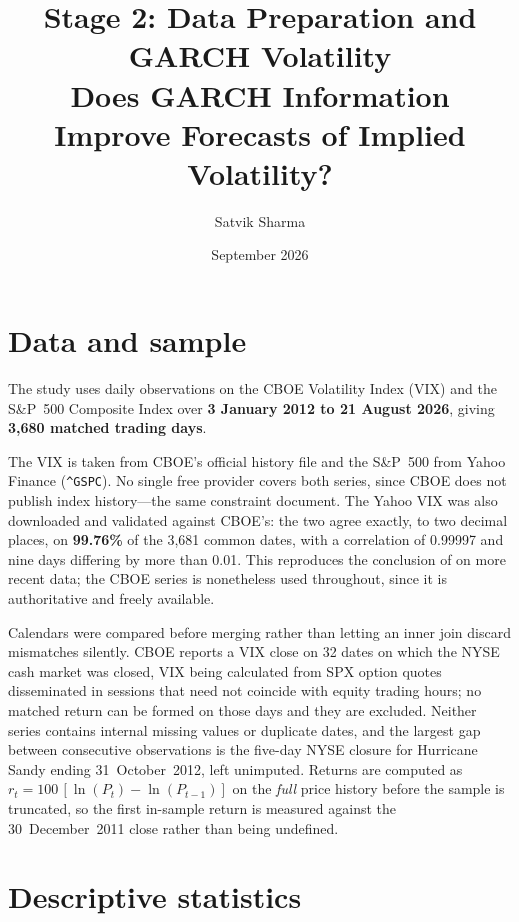 \documentclass[10pt,a4paper]{article}
\title{\vspace{-1.4cm}\textbf{Stage 2: Data Preparation and GARCH Volatility}\\[0.3em]
\large Does GARCH Information Improve Forecasts of Implied Volatility?}
\author{Satvik Sharma}
\date{September 2026}
\begin{document}
\maketitle
\vspace{-0.8em}

\section{Data and sample}

The study uses daily observations on the CBOE Volatility Index (VIX) and the S\&P~500
Composite Index over \textbf{3 January 2012 to 21 August 2026}, giving
\textbf{3,680 matched trading days}.

The VIX is taken from CBOE's official history file and the S\&P~500 from Yahoo Finance
(\texttt{\^{}GSPC}). No single free provider covers both series, since CBOE does not
publish index history---the same constraint \citet{liu2015} document. The Yahoo VIX was
also downloaded and validated against CBOE's: the two agree exactly, to two decimal
places, on \textbf{99.76\%} of the 3,681 common dates, with a correlation of 0.99997 and
nine days differing by more than 0.01. This reproduces the conclusion of \citet{liu2015}
on more recent data; the CBOE series is nonetheless used throughout, since it is
authoritative and freely available.

Calendars were compared before merging rather than letting an inner join discard
mismatches silently. CBOE reports a VIX close on 32 dates on which the NYSE cash market
was closed, VIX being calculated from SPX option quotes disseminated in sessions that
need not coincide with equity trading hours; no matched return can be formed on those
days and they are excluded. Neither series contains internal missing values or duplicate
dates, and the largest gap between consecutive observations is the five-day NYSE closure
for Hurricane Sandy ending 31~October~2012, left unimputed. Returns are computed as
$r_t = 100\,[\ln(P_t) - \ln(P_{t-1})]$ on the \emph{full} price history before the sample
is truncated, so the first in-sample return is measured against the 30~December~2011
close rather than being undefined.

\section{Descriptive statistics}
\end{document}
